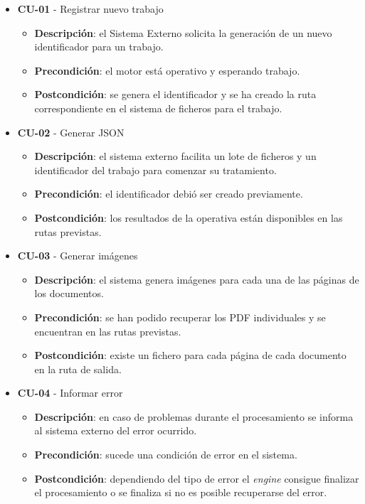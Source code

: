 \begin{itemize}
	\item \textbf{CU-01} - Registrar nuevo trabajo
	\begin{itemize}
		\item \textbf{Descripción}: el Sistema Externo solicita la generación de un nuevo identificador para un trabajo.
		\item \textbf{Precondición}: el motor está operativo y esperando trabajo.
		\item \textbf{Postcondición}: se genera el identificador y se ha creado la ruta correspondiente en el sistema de ficheros para el trabajo.
	\end{itemize}
\item \textbf{CU-02} - Generar JSON
	\begin{itemize}
		\item \textbf{Descripción}: el sistema externo facilita un lote de ficheros y un identificador del trabajo para comenzar su tratamiento.
		\item \textbf{Precondición}: el identificador debió ser creado previamente.
		\item \textbf{Postcondición}: los resultados de la operativa están disponibles en las rutas previstas.
\end{itemize}
\item \textbf{CU-03} - Generar imágenes
	\begin{itemize}
		\item \textbf{Descripción}: el sistema genera imágenes para cada una de las páginas de los documentos.
		\item \textbf{Precondición}: se han podido recuperar los PDF individuales y se encuentran en las rutas previstas.
		\item \textbf{Postcondición}: existe un fichero para cada página de cada documento en la ruta de salida.
\end{itemize}
\item \textbf{CU-04} - Informar error
	\begin{itemize}
		\item \textbf{Descripción}: en caso de problemas durante el procesamiento se informa al sistema externo del error ocurrido.
		\item \textbf{Precondición}: sucede una condición de error en el sistema.
		\item \textbf{Postcondición}: dependiendo del tipo de error el \emph{engine} consigue finalizar el procesamiento o se finaliza si no es posible recuperarse del error.

\end{itemize}
\end{itemize}
